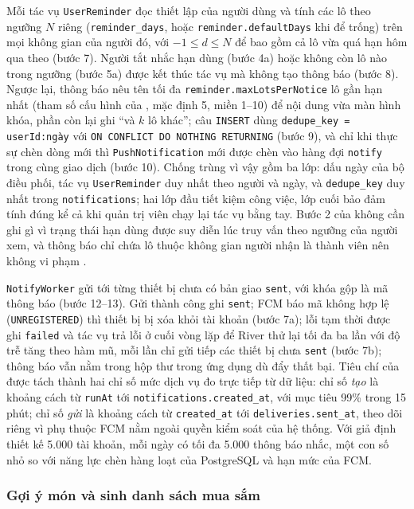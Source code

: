 Mỗi tác vụ \texttt{UserReminder} đọc thiết lập của người dùng và tính các lô theo ngưỡng $N$ riêng (\texttt{reminder\_days}, hoặc \texttt{reminder.defaultDays} khi để trống) trên mọi không gian của người đó, với $-1 \le d \le N$ để bao gồm cả lô vừa quá hạn hôm qua theo  (bước 7). Người tắt nhắc hạn dùng (bước 4a) hoặc không còn lô nào trong ngưỡng (bước 5a) được kết thúc tác vụ mà không tạo thông báo (bước 8). Ngược lại, thông báo nêu tên tối đa \texttt{reminder.maxLotsPerNotice} lô gần hạn nhất (tham số cấu hình của , mặc định 5, miền 1--10) để nội dung vừa màn hình khóa, phần còn lại ghi “và $k$ lô khác”; câu \texttt{INSERT} dùng \texttt{dedupe\_key = userId:ngày} với \texttt{ON CONFLICT DO NOTHING RETURNING} (bước 9), và chỉ khi thực sự chèn dòng mới thì \texttt{PushNotification} mới được chèn vào hàng đợi \texttt{notify} trong cùng giao dịch (bước 10). Chống trùng vì vậy gồm ba lớp: dấu ngày của bộ điều phối, tác vụ \texttt{UserReminder} duy nhất theo người và ngày, và \texttt{dedupe\_key} duy nhất trong \texttt{notifications}; hai lớp đầu tiết kiệm công việc, lớp cuối bảo đảm tính đúng kể cả khi quản trị viên chạy lại tác vụ bằng tay. Bước 2 của  không cần ghi gì vì trạng thái hạn dùng được suy diễn lúc truy vấn theo ngưỡng của người xem, và thông báo chỉ chứa lô thuộc không gian người nhận là thành viên nên không vi phạm .

\texttt{NotifyWorker} gửi tới từng thiết bị chưa có bản giao \texttt{sent}, với khóa gộp là mã thông báo (bước 12--13). Gửi thành công ghi \texttt{sent}; FCM báo mã không hợp lệ (\texttt{UNREGISTERED}) thì thiết bị bị xóa khỏi tài khoản (bước 7a); lỗi tạm thời được ghi \texttt{failed} và tác vụ trả lỗi ở cuối vòng lặp để River thử lại tối đa ba lần với độ trễ tăng theo hàm mũ, mỗi lần chỉ gửi tiếp các thiết bị chưa \texttt{sent} (bước 7b); thông báo vẫn nằm trong hộp thư trong ứng dụng dù đẩy thất bại. Tiêu chí của  được tách thành hai chỉ số mức dịch vụ đo trực tiếp từ dữ liệu: chỉ số \emph{tạo} là khoảng cách từ \texttt{runAt} tới \texttt{notifications.created\_at}, với mục tiêu 99\% trong 15 phút; chỉ số \emph{gửi} là khoảng cách từ \texttt{created\_at} tới \texttt{deliveries.sent\_at}, theo dõi riêng vì phụ thuộc FCM nằm ngoài quyền kiểm soát của hệ thống. Với giả định thiết kế 5.000 tài khoản, mỗi ngày có tối đa 5.000 thông báo nhắc, một con số nhỏ so với năng lực chèn hàng loạt của PostgreSQL và hạn mức của FCM.

\subsubsection{Gợi ý món và sinh danh sách mua sắm}\label{sssec:kt-goi-y}


